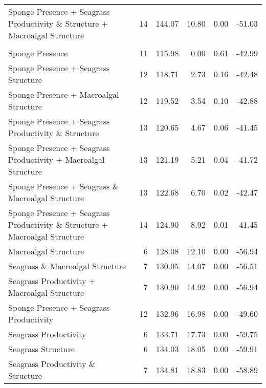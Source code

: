 \documentclass[
]{article}
\begin{document}
\begin{table}
{\begin{tabular}[t]{lrrrrr}
\hspace{1em}Sponge Presence + Seagrass Productivity \& Structure + Macroalgal Structure & 14 & 144.07 & 10.80 & 0.00 & -51.03\\
\addlinespace[0.3em]
\multicolumn{6}{l}{\textbf{Species Richness}}\\
\hspace{1em}Sponge Presence & 11 & 115.98 & 0.00 & 0.61 & -42.99\\
\hspace{1em}Sponge Presence + Seagrass Structure & 12 & 118.71 & 2.73 & 0.16 & -42.48\\
\hspace{1em}Sponge Presence + Macroalgal Structure & 12 & 119.52 & 3.54 & 0.10 & -42.88\\
\hspace{1em}Sponge Presence + Seagrass Productivity \& Structure & 13 & 120.65 & 4.67 & 0.06 & -41.45\\
\hspace{1em}Sponge Presence + Seagrass Productivity + Macroalgal Structure & 13 & 121.19 & 5.21 & 0.04 & -41.72\\
\hspace{1em}Sponge Presence + Seagrass \& Macroalgal Structure & 13 & 122.68 & 6.70 & 0.02 & -42.47\\
\hspace{1em}Sponge Presence + Seagrass Productivity \& Structure + Macroalgal Structure & 14 & 124.90 & 8.92 & 0.01 & -41.45\\
\hspace{1em}Macroalgal Structure & 6 & 128.08 & 12.10 & 0.00 & -56.94\\
\hspace{1em}Seagrass \& Macroalgal Structure & 7 & 130.05 & 14.07 & 0.00 & -56.51\\
\hspace{1em}Seagrass Productivity + Macroalgal Structure & 7 & 130.90 & 14.92 & 0.00 & -56.94\\
\hspace{1em}Sponge Presence + Seagrass Productivity & 12 & 132.96 & 16.98 & 0.00 & -49.60\\
\hspace{1em}Seagrass Productivity & 6 & 133.71 & 17.73 & 0.00 & -59.75\\
\hspace{1em}Seagrass Structure & 6 & 134.03 & 18.05 & 0.00 & -59.91\\
\hspace{1em}Seagrass Productivity \& Structure & 7 & 134.81 & 18.83 & 0.00 & -58.89\\
\bottomrule
\end{tabular}}
\end{table}
\end{document}
